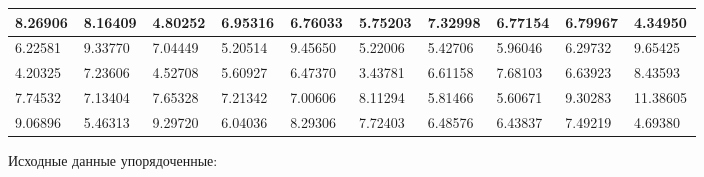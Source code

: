 \begin{changemargin}{-4cm}{0cm}
{\begin{tabular}{|p{0.08\linewidth}|p{0.08\linewidth}|p{0.08\linewidth}|p{0.08\linewidth}|p{0.08\linewidth}|p{0.08\linewidth}|p{0.08\linewidth}|p{0.08\linewidth}|p{0.08\linewidth}|p{0.08\linewidth}|}
\hline%
8.26906&8.16409&4.80252&6.95316&6.76033&5.75203&7.32998&6.77154&6.79967&4.34950\\%
\hline%
6.22581&9.33770&7.04449&5.20514&9.45650&5.22006&5.42706&5.96046&6.29732&9.65425\\%
\hline%
4.20325&7.23606&4.52708&5.60927&6.47370&3.43781&6.61158&7.68103&6.63923&8.43593\\%
\hline%
7.74532&7.13404&7.65328&7.21342&7.00606&8.11294&5.81466&5.60671&9.30283&11.38605\\%
\hline%
9.06896&5.46313&9.29720&6.04036&8.29306&7.72403&6.48576&6.43837&7.49219&4.69380\\%
\hline%
\end{tabular}%
\newline%
\newline%
%
}\end{changemargin}%
\newpage%
Исходные данные упорядоченные:\newline%
\newline%
%

